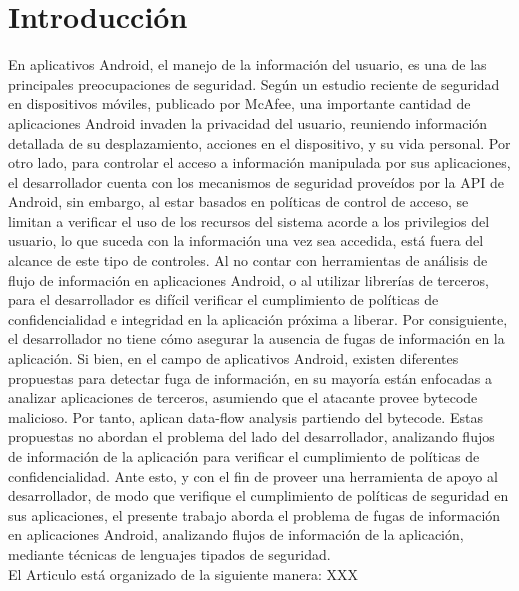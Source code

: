 \section{Introducción}
En aplicativos Android, el manejo de la información del usuario, es una de las
principales preocupaciones de seguridad. Según un estudio reciente de seguridad
en dispositivos móviles, publicado por McAfee\cite{McAfeeReport}, una importante
cantidad de aplicaciones Android invaden la privacidad del usuario, reuniendo
información detallada de su desplazamiento, acciones en el dispositivo, y su
vida personal.\newline
Por otro lado, para controlar el acceso a información manipulada por sus
aplicaciones, el desarrollador cuenta con los mecanismos de seguridad proveídos
por la API de Android, sin embargo, al estar basados en políticas de control de
acceso, se limitan a verificar el uso de los recursos del sistema acorde a los
privilegios del usuario, lo que suceda con la información una vez sea accedida,
está fuera del alcance de este tipo de controles. Al no contar con herramientas
de análisis de flujo de información en aplicaciones Android, o al utilizar
librerías de terceros, para el desarrollador es difícil verificar
el cumplimiento de políticas de confidencialidad e integridad en la aplicación
próxima a liberar. Por consiguiente, el desarrollador no tiene cómo asegurar la
ausencia de fugas de información en la aplicación.\newline 
Si bien, en el campo de aplicativos Android, existen diferentes propuestas para
detectar fuga de información, en su mayoría están enfocadas a analizar
aplicaciones de terceros, asumiendo que el atacante provee bytecode malicioso.
Por tanto, aplican data-flow analysis partiendo del bytecode. Estas propuestas
no abordan el problema del lado del desarrollador, analizando flujos de
información de la aplicación para verificar el cumplimiento de políticas de
confidencialidad.\newline
Ante esto, y con el fin de proveer una herramienta de apoyo al desarrollador, de
modo que verifique el cumplimiento de políticas de seguridad en sus
aplicaciones, el presente trabajo aborda el problema de fugas de información en
aplicaciones Android, analizando flujos de información de la aplicación,
mediante técnicas de lenguajes tipados de seguridad.\\
El Articulo está organizado de la siguiente manera: XXX

